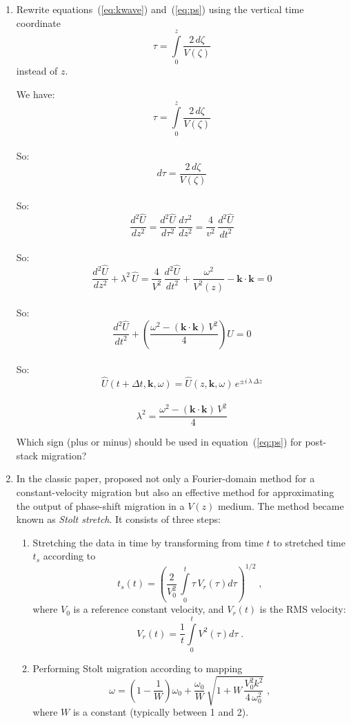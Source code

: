 \begin{enumerate}
\item Rewrite equations~(\ref{eq:kwave}) and~(\ref{eq:ps}) using the vertical time coordinate 
\[
\tau = \int\limits_{0}^{z} \frac{2\,d\zeta}{V(\zeta)}
\]
instead of $z$. 

\answer
{We have: \[\tau = \int\limits_{0}^{z} \frac{2\,d\zeta}{V(\zeta)}\]\\
So: \[d\tau = \frac{2\,d\zeta}{V(\zeta)}\]\\
So: \[\frac{d^2 \hat{U}}{d z^2} = \frac{d^2 \hat{U}}{d \tau^2}\,\frac{d \tau^2}{d z^2} = \frac{4}{v^2}\,\frac{d^2 \hat{U}}{d t^2}\]\\
So: \[\frac{d^2 \hat{U}}{d z^2} + \lambda^2\,\hat{U} = \frac{4}{V^2}\,\frac{d^2 \hat{U}}{d t^2} + \frac{\omega^2}{V^2(z)} - \mathbf{k} \cdot \mathbf{k} = 0\]\\
So: \[\frac{d^2 \hat{U}}{d t^2} + (\frac{\omega^2 - (\mathbf{k} \cdot \mathbf{k})\,V^2}{4}) \hat{U} = 0\]\\
So: \[\hat{U}(t+\Delta t,\mathbf{k},\omega) = \hat{U}(z,\mathbf{k},\omega)\,e^{\pm i\,\lambda\,\Delta z}\]\\
\[\lambda^2 = \frac{\omega^2 - (\mathbf{k} \cdot \mathbf{k})\,V^2}{4}\]        
}

Which sign (plus or minus) should be used in
equation~(\ref{eq:ps}) for post-stack migration?



\item In the classic paper, \cite{GEO50-11-22192244} proposed not only a Fourier-domain method for a constant-velocity migration but also an effective method for approximating the output of phase-shift migration in a $V(z)$ medium. The method became known as \emph{Stolt stretch}. It consists of three steps:
\begin{enumerate}
\item Stretching the data in time by transforming from time $t$ to stretched time $t_s$ according to
\begin{equation}
t_s(t)={\left(\frac{2}{V_0^2}\,\int\limits_0^t \tau\,V_r(\tau) d \tau\right)}^{1/2}\;,
\label{eqn:ss} 
\end{equation}
where $V_0$ is a reference constant velocity, and $V_r(t)$ is the RMS velocity:
\[ 
V_r(t) = \frac{1}{t} \int\limits_0^t V^2(\tau) d \tau\;.
\]
\item Performing Stolt migration according to mapping
\begin{equation}
\omega = 
\left(1-\frac{1}{W}\right) \omega_0+
\frac{\omega_0}{W}\,
\sqrt{1 + W\,\frac{V_0^2 k^2}{4\,\omega_0^2}}\;,
\label{eqn:sdispersion} 
\end{equation}
where $W$ is a constant (typically between 1 and 2).


\end{enumerate}
\end{enumerate}
